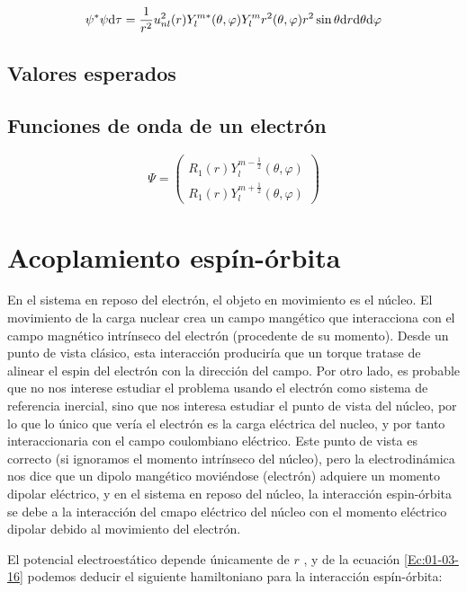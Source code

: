 \begin{equation}
    \psi^* \psi \mathrm{d} \tau = \frac{1}{r^2} u_{nl}^2 (r) Y_l^{m*} (\theta , \varphi)  Y_l^m r^2 (\theta , \varphi) r^2 \sin \theta \mathrm{d} r \mathrm{d} \theta \mathrm{d} \varphi
\end{equation}


\subsection{Valores esperados}

\subsection{Funciones de onda de un electrón}

\begin{equation}
    \Psi = \begin{pmatrix}
    R_1 (r) Y_l^{m-\frac{1}{2}} (\theta,\varphi) \\
    R_1 (r) Y_l^{m+\frac{1}{2}} (\theta,\varphi) 
    \end{pmatrix}
\end{equation}


\section{Acoplamiento espín-órbita}

En el sistema en reposo del electrón, el objeto en movimiento es el núcleo. El movimiento de la carga nuclear crea un campo mangético que interacciona con el campo magnético intrínseco del electrón (procedente de su momento). Desde un punto de vista clásico, esta interacción produciría que un torque tratase de alinear el espin del electrón con la dirección del campo. Por otro lado, es probable que no nos interese estudiar el problema usando el electrón como sistema de referencia inercial, sino que nos interesa estudiar el punto de vista del núcleo, por lo que lo único que vería el electrón es la carga eléctrica del nucleo, y por tanto interaccionaria con el campo coulombiano eléctrico. Este punto de vista es correcto (si ignoramos el momento intrínseco del núcleo), pero la electrodinámica nos dice que un dipolo mangético moviéndose (electrón) adquiere un momento dipolar eléctrico, y en el sistema en reposo del núcleo, la interacción espin-órbita se debe a la interacción del cmapo eléctrico del núcleo con el momento eléctrico dipolar debido al movimiento del electrón. 

El potencial electroestático depende únicamente de $r$ , y de la ecuación \ref{Ec:01-03-16} podemos deducir el siguiente hamiltoniano para la interacción espín-órbita:

